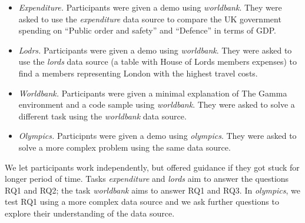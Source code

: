 \documentclass{sigchi}
\begin{document}
\begin{itemize}
\item \emph{Expenditure.} Participants were given a demo using \emph{worldbank}.
  They were asked to use the \emph{expenditure} data source to compare the UK government spending
  on ``Public order and safety'' and ``Defence'' in terms of GDP.
\item \emph{Lodrs.} Participants were given a demo using \emph{worldbank}.
  They were asked to use the \emph{lords} data source (a table with House of Lords
  members expenses) to find a members representing London with the highest travel costs.
\item \emph{Worldbank.} Participants were given a minimal explanation of The Gamma environment and
  a code sample using \emph{worldbank}. They were asked to solve a different task using
  the \emph{worldbank} data source.
\item \emph{Olympics.} Participnts were given a demo using \emph{olympics}.
  They were asked to solve a more complex problem using the same data source.
\end{itemize}

We let participants work independently, but offered guidance if they got stuck for longer period of
time. Tasks \emph{expenditure} and \emph{lords} aim to answer the questions RQ1 and RQ2; the task
\emph{worldbank} aims to answer RQ1 and RQ3. In \emph{olympics}, we test RQ1 using a more complex
data source and we ask further questions to explore their understanding of the data source.
\end{document}
